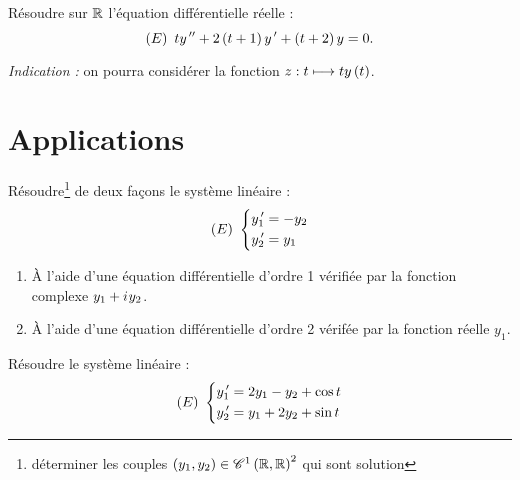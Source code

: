 \begin{exo}[Exercice 14]
Résoudre sur \(\mathbb{R}\) l'équation différentielle réelle : \[\left(E\right)~ty^{\,\prime\prime}+2\left(t+1\right)y^{\,\prime}+\left(t+2\right)y=0.\]

\textit{Indication :} on pourra considérer la fonction \(z:t\longmapsto ty\left(t\right)\).
\end{exo}

\begin{corr}
\end{corr}

\section{Applications}

\begin{exo}[Exercice 15]
Résoudre\footnote{\Cad déterminer les couples \(\left(y_1,y_2\right)\in\mathscr{C}^{1}\left(\mathbb{R},\mathbb{R}\right)^2\) qui sont solution} de deux façons le système linéaire : \[\left(E\right)~\begin{dcases}
y_1^{\,\prime}=-y_2 \\
y_2^{\,\prime}=y_1
\end{dcases}\]

\begin{enumerate}
    \item À l'aide d'une équation différentielle d'ordre 1 vérifiée par la fonction complexe \(y_1+i\mkern1mu y_2\). \\
    \item À l'aide d'une équation différentielle d'ordre 2 vérifée par la fonction réelle \(y_1\).
\end{enumerate}
\end{exo}

\begin{corr}
\end{corr}

\begin{exo}[Exercice 16]
Résoudre le système linéaire : \[\left(E\right)~\begin{dcases}
y_1^{\,\prime}=2y_1-y_2+\cos t \\
y_2^{\,\prime}=y_1+2y_2+\sin t
\end{dcases}\]
\end{exo}

\begin{corr}
\end{corr}


